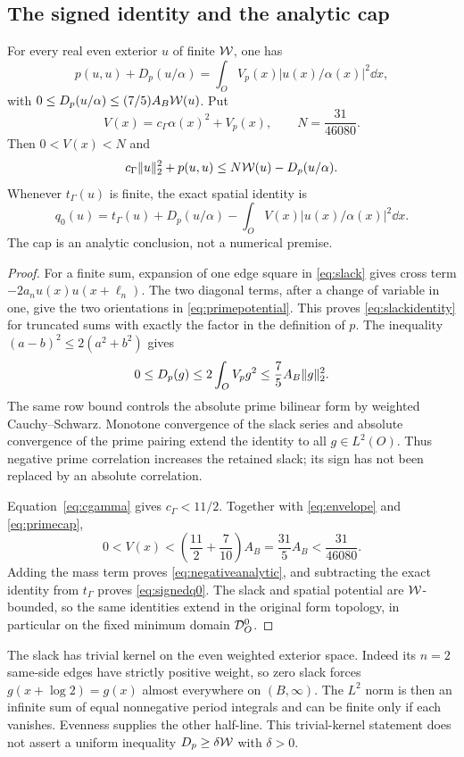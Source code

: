 \subsection{The signed identity and the analytic cap}
\begin{theorem}\label{thm:signed}
For every real even exterior $u$ of finite $\mathcal W$, one has
\begin{equation}\label{eq:slackidentity}
 p(u,u)+D_p(u/\alpha)
 =\int_O V_p(x)|u(x)/\alpha(x)|^2\dd x,
\end{equation}
with $0\le D_p(u/\alpha)\le(7/5)A_B\mathcal W(u)$.
Put
\[
 V(x)=c_\Gamma\alpha(x)^2+V_p(x),\qquad N=\frac{31}{46080}.
\]
Then $0<V(x)<N$ and
\begin{equation}\label{eq:negativeanalytic}
 c_\Gamma\lVert u\rVert_2^2+p(u,u)
 \le N \mathcal W(u)-D_p(u/\alpha).
\end{equation}
Whenever $t_\Gamma(u)$ is finite, the exact spatial identity is
\begin{equation}\label{eq:signedq0}
 q_0(u)=t_\Gamma(u)+D_p(u/\alpha)
              -\int_OV(x)|u(x)/\alpha(x)|^2\dd x.
\end{equation}
The cap is an analytic conclusion, not a numerical premise.
\end{theorem}
\begin{proof}
For a finite sum, expansion of one edge square in \eqref{eq:slack}
gives cross term $-2a_nu(x)u(x+\ell_n)$. The two diagonal terms,
after a change of variable in one, give the two orientations in
\eqref{eq:primepotential}. This proves \eqref{eq:slackidentity} for
truncated sums with exactly the factor in the definition of $p$.
The inequality $(a-b)^2\le2(a^2+b^2)$ gives
\[
 0\le D_p(g)\le2\int_OV_pg^2\le\frac75 A_B\lVert g\rVert_2^2.
\]
The same row bound controls the absolute prime bilinear form by
weighted Cauchy--Schwarz. Monotone convergence of the slack series and
absolute convergence of the prime pairing extend the identity to all
$g\in L^2(O)$. Thus negative prime correlation increases the retained
slack; its sign has not been replaced by an absolute correlation.

Equation~\eqref{eq:cgamma} gives $c_\Gamma<11/2$. Together with
\eqref{eq:envelope} and \eqref{eq:primecap},
\[
 0<V(x)<\left(\frac{11}{2}+\frac7{10}\right)A_B
 =\frac{31}{5}A_B<\frac{31}{46080}.
\]
Adding the mass term proves \eqref{eq:negativeanalytic}, and
subtracting the exact identity from $t_\Gamma$ proves
\eqref{eq:signedq0}. The slack and spatial potential are $\mathcal W$-bounded,
so the same identities extend in the original form topology, in
particular on the fixed minimum domain $\mathcal D_O^0$.
\end{proof}

The slack has trivial kernel on the even weighted exterior space.
Indeed its $n=2$ same-side edges have strictly positive weight, so
zero slack forces $g(x+\log2)=g(x)$ almost everywhere on $(B,\infty)$.
The $L^2$ norm is then an infinite sum of equal nonnegative period
integrals and can be finite only if each vanishes. Evenness supplies
the other half-line. This trivial-kernel statement does not assert a
uniform inequality $D_p\ge\delta\mathcal W$ with $\delta>0$.


